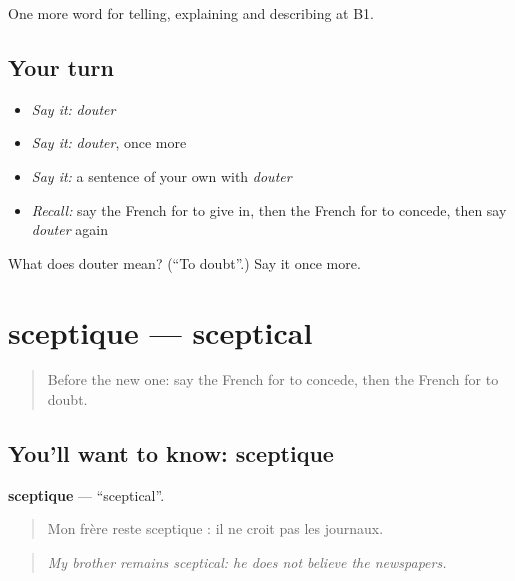 \begin{grammarlens}[title={What you've built}]
One more word for telling, explaining and describing at B1.
\end{grammarlens}

\subsection*{Your turn}
\begin{itemize}
\raggedright
  \item \emph{Say it:} \emph{douter}
  \item \emph{Say it:} \emph{douter}, once more
  \item \emph{Say it:} a sentence of your own with \emph{douter}
  \item \emph{Recall:} say the French for to give in, then the French for to concede, then say \emph{douter} again
\end{itemize}

\begin{tcolorbox}[breakable,colback=teal!4,colframe=teal!35!black,title={Before you move on}]
What does douter mean? (\textquotedblleft{}To doubt\textquotedblright{}.) Say it once more.
\end{tcolorbox}
\section[sceptique]{sceptique — sceptical}

\label{lesson:FR-C338-sceptique}



\begin{quote}
Before the new one: say the French for to concede, then the French for to doubt.
\end{quote}

\subsection*{You'll want to know: sceptique}
\textbf{sceptique} — \textquotedblleft{}sceptical\textquotedblright{}.

\begin{quote}
Mon frère reste sceptique : il ne croit pas les journaux.
\end{quote}

\begin{quote}
\emph{My brother remains sceptical: he does not believe the newspapers.}
\end{quote}

